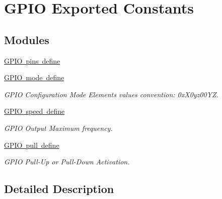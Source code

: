 \hypertarget{group___g_p_i_o___exported___constants}{}\section{G\+P\+IO Exported Constants}
\label{group___g_p_i_o___exported___constants}
\subsection*{Modules}
\begin{DoxyCompactItemize}
\item 
\mbox{\hyperlink{group___g_p_i_o__pins__define}{G\+P\+I\+O pins define}}
\item 
\mbox{\hyperlink{group___g_p_i_o__mode__define}{G\+P\+I\+O mode define}}
\begin{DoxyCompactList}\small\item\em G\+P\+IO Configuration Mode Elements values convention\+: 0x\+X0yz00\+YZ. \end{DoxyCompactList}\item 
\mbox{\hyperlink{group___g_p_i_o__speed__define}{G\+P\+I\+O speed define}}
\begin{DoxyCompactList}\small\item\em G\+P\+IO Output Maximum frequency. \end{DoxyCompactList}\item 
\mbox{\hyperlink{group___g_p_i_o__pull__define}{G\+P\+I\+O pull define}}
\begin{DoxyCompactList}\small\item\em G\+P\+IO Pull-\/\+Up or Pull-\/\+Down Activation. \end{DoxyCompactList}\end{DoxyCompactItemize}


\subsection{Detailed Description}
